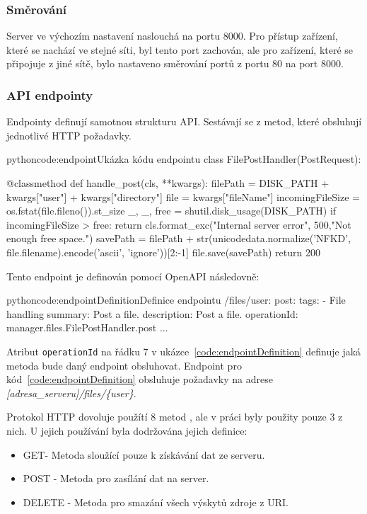 \documentclass[
  glossaries,
]{kidiplom}
\begin{document}
\subsubsection{Směrování}
Server ve výchozím nastavení naslouchá na portu 8000. Pro přístup zařízení, které se nachází ve stejné síti, byl tento port zachován, ale pro zařízení, které se připojuje z jiné sítě, bylo nastaveno směrování portů z portu 80 na port 8000.

\subsubsection{API endpointy}
Endpointy definují samotnou strukturu API. Sestávají se z metod, které obsluhují jednotlivé HTTP požadavky.
\begin{kicode}{python}{code:endpoint}{Ukázka kódu endpointu}
class FilePostHandler(PostRequest):

    @classmethod
    def handle_post(cls, **kwargs):
        filePath = DISK_PATH + kwargs["user"] + kwargs["directory"]
        file = kwargs["fileName"]
        incomingFileSize = os.fstat(file.fileno()).st_size
        _, _, free = shutil.disk_usage(DISK_PATH)
        if incomingFileSize > free:
            return cls.format_exc("Internal server error", 500,"Not enough free space.") 
        savePath = filePath + str(unicodedata.normalize('NFKD', file.filename).encode('ascii', 'ignore'))[2:-1]
        file.save(savePath)
        return 200
\end{kicode}
\clearpage
Tento endpoint je definován pomocí OpenAPI následovně:

\begin{kicode}{python}{code:endpointDefinition}{Definice endpointu}
  /files/{user}:
    post:
      tags: 
        - File handling
      summary: Post a file.
      description: Post a file.
      operationId: manager.files.FilePostHandler.post
      ...
\end{kicode}


Atribut \texttt{operationId} na řádku 7 v ukázce~\ref{code:endpointDefinition} definuje jaká metoda bude daný endpoint obsluhovat. Endpoint pro kód~\ref{code:endpointDefinition} obsluhuje požadavky na adrese  \mbox{\textit{[adresa\_serveru]/files/\{user\}}}.

Protokol HTTP dovoluje použítí 8 metod \cite{HTTPmethods}, ale v práci byly použity pouze 3 z nich. U jejich používání byla dodržována jejich definice:
\begin{itemize}
	\item GET- Metoda sloužící pouze k získávání dat ze serveru.
	\item POST - Metoda pro zasílání dat na server.
	\item DELETE - Metoda pro smazání všech výskytů zdroje z URI. 
\end{itemize}
\end{document}
